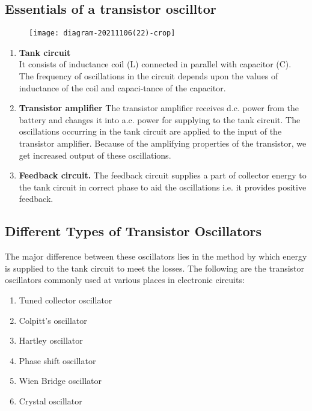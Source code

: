 \subsection{Essentials of a transistor oscilltor}
\begin{figure}[H]
	\centering
	\texttt{[image: diagram-20211106(22)-crop]}
	\caption{}
	\label{}
\end{figure}
\begin{enumerate}
	\item \textbf{Tank circuit}\\
	It consists of inductance coil (L) connected in parallel with capacitor (C). The
	frequency of oscillations in the circuit depends upon the values of inductance of the coil and capaci-tance of the capacitor.
	\item \textbf{Transistor amplifier}
	The transistor amplifier receives d.c. power from the battery and changes it into a.c. power for supplying to the tank circuit. The oscillations occurring in the tank circuit are applied to the input of the transistor amplifier. Because of the amplifying properties of the transistor, we get increased output of these oscillations.
	\item \textbf{Feedback circuit.}
	The feedback circuit supplies a part of collector energy to the tank circuit in correct phase to aid the oscillations i.e. it provides positive feedback.
\end{enumerate}

 \subsection{Different Types of Transistor Oscillators}
 The major difference between these oscillators lies in the method by which energy is supplied to the tank circuit to meet the losses. The following are the transistor oscillators commonly used at various places in electronic circuits:
 \begin{enumerate}
 	\item Tuned collector oscillator
 	\item Colpitt's oscillator
 	\item Hartley oscillator
 	\item Phase shift oscillator
 	\item Wien Bridge oscillator
 	\item Crystal oscillator
 	
 \end{enumerate}

